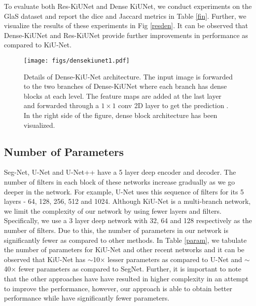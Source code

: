 \documentclass[journal,twoside,web]{ieeecolor}
\begin{document}
To evaluate both Res-KiUNet and Dense KiUNet, we conduct experiments on the GlaS dataset and report the dice and Jaccard metrics in Table \ref{fin}. Further, we   visualize the results of these experiments in Fig \ref{resden}. It can be observed that Dense-KiUNet and Res-KiUNet provide further improvements in performance as compared to KiU-Net.
\begin{figure*}[htb]
	\centering
	\texttt{[image: figs/densekiunet1.pdf]}\\
	
	
	\caption{Details of Dense-KiU-Net architecture. The input image is forwarded to the two branches of Dense-KiUNet where each branch has dense blocks at each level. The feature maps are added at the last layer and forwarded through a $1 \times 1$ conv 2D layer to get the prediction . In the right side of the figure, dense block architecture has been visualized.  }
	\label{densekiu}
	
\end{figure*}
\subsection{Number of Parameters}

Seg-Net, U-Net and U-Net++ have a 5 layer deep encoder and decoder. The number of filters in each block of these networks increase gradually as we go deeper in the network. For example, U-Net uses this sequence of filters for its 5 layers - 64, 128, 256, 512 and 1024. Although KiU-Net is a multi-branch network, we limit the complexity of our network by using  fewer     layers and  filters. Specifically,  we use a 3 layer deep network with 32, 64 and 128  respectively as the number of filters. Due to this, the number of parameters in our network is significantly  fewer   as compared to other methods. In Table \ref{param}, we tabulate the number of parameters for KiU-Net and other recent networks and it can be observed   that  KiU-Net has $\sim$10$\times$ lesser parameters as compared to U-Net and $\sim$40$\times$ fewer parameters as compared to SegNet. Further, it is important to note that the other approaches have have resulted in   higher complexity in an attempt to improve the performance,  however, our approach is able to obtain better performance while have significantly fewer parameters.
\begin{table}[htbp]
	\caption{Comparison of number of parameters}
\end{table}
\end{document}
